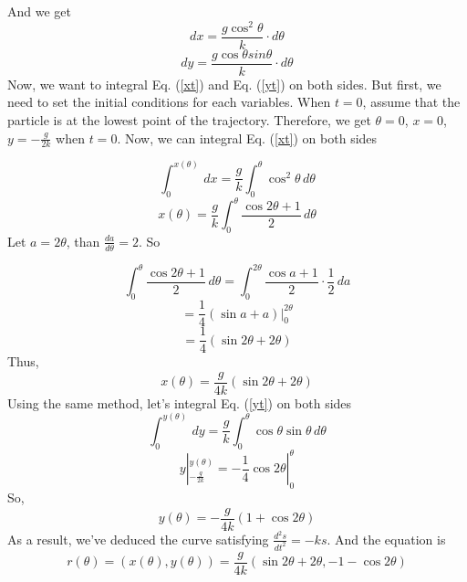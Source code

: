 \documentclass{article}
\begin{document}
And we get
    \begin{equation}
    dx=\frac{g\cos^{2}\theta}{k}\cdot d\theta\label{xt}
    \end{equation}
    \begin{equation}
    dy=\frac{g\cos\theta sin\theta}{k}\cdot d\theta\label{yt}
    \end{equation}
Now, we want to integral Eq. (\ref{xt}) and Eq. ({\ref{yt}}) on both sides. But first, we need to set the initial conditions for each variables. When $t=0$, assume that the particle is at the lowest point of the trajectory. Therefore, we get $\theta=0$, $x=0$, $y=-\frac{g}{2k}$ when $t=0$. Now, we can integral Eq. (\ref{xt}) on both sides

    $$\int_{0}^{x(\theta)}\,dx=\frac{g}{k}\int_{0}^{\theta}\cos^{2}\theta\,d\theta$$
    $$x(\theta)=\frac{g}{k}\int_{0}^{\theta}\frac{\cos2\theta+1}{2}\,d\theta$$
Let $a=2\theta$, than $\frac{da}{d\theta}=2$. So

 $$\int_{0}^{\theta}\frac{\cos2 \theta+1}{2}\,d\theta=\int_{0}^{2\theta}\frac{\cos a+1}{2}\cdot\frac{1}{2}\,da$$
    $$=\frac{1}{4}(\sin a+a)|_{0}^{2\theta}$$
    $$=\frac{1}{4}(\sin 2\theta+2\theta)$$
Thus,
    \begin{equation*}
    x(\theta)=\frac{g}{4k} (\sin 2 \theta+2\theta)
    \end{equation*}
Using the same method, let's integral Eq. (\ref{yt}) on both sides
    $$\int_{0}^{y(\theta)}\,dy=\frac{g}{k}\int_{0}^{\theta}\cos\theta \sin\theta\,d\theta$$
    $$y|_{-\frac{g}{2k}}^{y(\theta)}=-\frac{1}{4}\cos 2\theta|_{0}^{\theta}$$
So,
    \begin{equation*}
    y(\theta)=-\frac{g}{4k}(1+\cos2\theta)
    \end{equation*}
As a result, we've  deduced the curve satisfying $\frac{d^{2}s}{dt^{2}}=-ks$. And the equation is
    \begin{equation*}
    r(\theta)=(x(\theta),y(\theta))=\frac{g}{4k}(\sin2\theta+2\theta, -1-\cos2\theta)
    \end{equation*}
    
\end{document}
